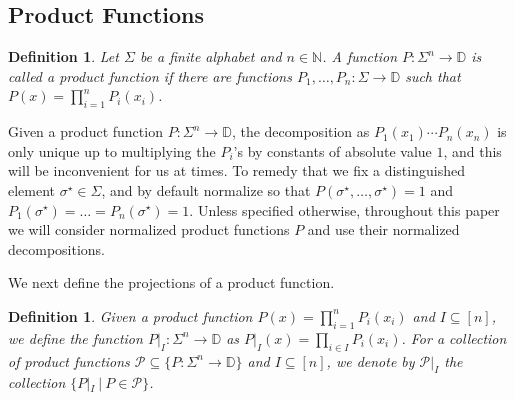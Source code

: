 \documentclass[10pt,a4paper]{amsart}
\newtheorem{definition}[thm]{Definition}
\begin{document}
\subsection{Product Functions}
\begin{definition}
    Let $\Sigma$ be a finite alphabet and $n\in\mathbb{N}$. A function $P\colon \Sigma^n\to\mathbb{D}$ is called a product function if there are functions $P_1,\ldots,P_n\colon \Sigma\to\mathbb{D}$ such that $P(x) = \prod\limits_{i=1}^{n}P_i(x_i)$.
\end{definition}
Given a product function $P\colon \Sigma^{n}\to\mathbb{D}$, the decomposition as $P_1(x_1)\cdots P_n(x_n)$ is only unique up to multiplying the $P_i$'s by constants of absolute value $1$, and this will be inconvenient for us at times. To remedy that we fix a distinguished element $\sigma^{\star}\in \Sigma$, and by default normalize so that $P(\sigma^{\star},\ldots,\sigma^{\star}) = 1$ and $P_1(\sigma^{\star})=\ldots=P_{n}(\sigma^{\star})=1$. Unless specified otherwise, throughout this paper we will consider normalized product functions $P$ and use their normalized decompositions.

We next define the projections of a product function.
\begin{definition}
    Given a product function $P(x) = \prod\limits_{i=1}^{n}P_i(x_i)$ and $I\subseteq [n]$, we define the function $P|_{I}\colon \Sigma^n\to\mathbb{D}$ as 
    $P|_{I}(x) = \prod\limits_{i\in I}P_i(x_i)$. For a collection of product functions $\mathcal{P}\subseteq \{P\colon \Sigma^n\to\mathbb{D}\}$ and $I\subseteq [n]$, we denote by 
    $\mathcal{P}|_{I}$ the collection $\{P|_{I}~|~P\in\mathcal{P}\}$.
\end{definition}
\end{document}
